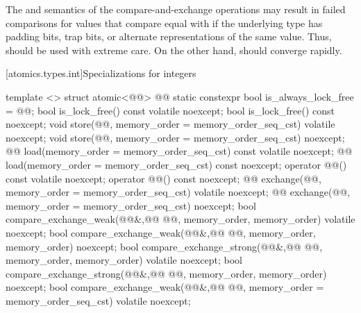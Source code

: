 \begin{itemdescr}
\pnum
\begin{note} The  and  semantics of the compare-and-exchange
operations may result in failed comparisons for values that compare equal with
 if the underlying type has padding bits, trap bits, or alternate
representations of the same value. Thus,  should be used
with extreme care. On the other hand,  should converge
rapidly. \end{note}
\end{itemdescr}

[atomics.types.int]{Specializations for integers}
\begin{codeblock}
  template <> struct atomic<@@> {
    @@
    static constexpr bool is_always_lock_free = @@;
    bool is_lock_free() const volatile noexcept;
    bool is_lock_free() const noexcept;
    void store(@@, memory_order = memory_order_seq_cst) volatile noexcept;
    void store(@@, memory_order = memory_order_seq_cst) noexcept;
    @@ load(memory_order = memory_order_seq_cst) const volatile noexcept;
    @@ load(memory_order = memory_order_seq_cst) const noexcept;
    operator @@() const volatile noexcept;
    operator @@() const noexcept;
    @@ exchange(@@, memory_order = memory_order_seq_cst) volatile noexcept;
    @@ exchange(@@, memory_order = memory_order_seq_cst) noexcept;
    bool compare_exchange_weak(@@&,@\itcorr[-1]@ @@,
                               memory_order, memory_order) volatile noexcept;
    bool compare_exchange_weak(@@&,@\itcorr[-1]@ @@,
                               memory_order, memory_order) noexcept;
    bool compare_exchange_strong(@@&,@\itcorr[-1]@ @@,
                                 memory_order, memory_order) volatile noexcept;
    bool compare_exchange_strong(@@&,@\itcorr[-1]@ @@,
                                 memory_order, memory_order) noexcept;
    bool compare_exchange_weak(@@&,@\itcorr[-1]@ @@,
                               memory_order = memory_order_seq_cst) volatile noexcept;
}
\end{codeblock}
